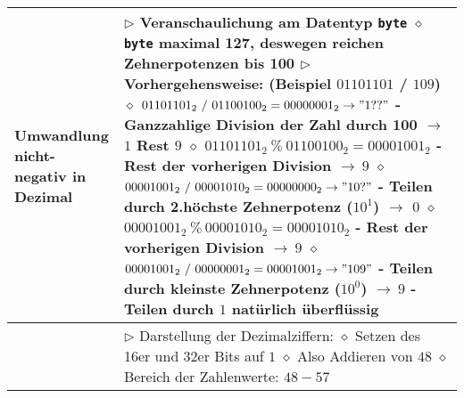 \begin{longtable}{ | p{} p{} | }
	\makecell[l]{Umwandlung nicht- \\ negativ in Dezimal} & \makecell[l]{
	$\triangleright$ Veranschaulichung am Datentyp \texttt{byte} \\
	\hspace{0.4cm} $\diamond$ \texttt{byte} maximal 127, deswegen reichen Zehnerpotenzen bis 100 \\
	$\triangleright$ Vorhergehensweise: (Beispiel $01101101$ / $109$) \\
	\hspace{0.4cm} $\diamond$ $01101101_2~/~01100100_2=00000001_2 \rightarrow "1??"$ \\
	\hspace{0.6cm} - Ganzzahlige Division der Zahl durch 100 $\rightarrow$ $1$ Rest $9$ \\
	\hspace{0.4cm} $\diamond$ $01101101_2~\%~01100100_2=00001001_2$ \\
	\hspace{0.6cm} - Rest der vorherigen Division $\rightarrow~9$ \\
	\hspace{0.4cm} $\diamond$ $00001001_2~/~00001010_2=00000000_2 \rightarrow "10?"$ \\
	\hspace{0.6cm} - Teilen durch 2.höchste Zehnerpotenz ($10^1$) $\rightarrow$ $0$ \\
	\hspace{0.4cm} $\diamond$ $00001001_2~\%~00001010_2=00001010_2$ \\
	\hspace{0.6cm} - Rest der vorherigen Division $\rightarrow~9$ \\
	\hspace{0.4cm} $\diamond$ $00001001_2~/~00000001_2=00001001_2 \rightarrow "109"$ \\
	\hspace{0.6cm} - Teilen durch kleinste Zehnerpotenz ($10^0$) $\rightarrow~9$ \\
	\hspace{0.6cm} - Teilen durch $1$ natürlich überflüssig} \\ \hline

	\makecell[l]{Unicode-Kodierung} & \makecell[l]{
	$\triangleright$ Darstellung der Dezimalziffern: \\
	\hspace{0.4cm} $\diamond$ Setzen des 16er und 32er Bits auf $1$ \\
	\hspace{0.4cm} $\diamond$ Also Addieren von $48$ \\
	\hspace{0.4cm} $\diamond$ Bereich der Zahlenwerte: $48-57$} \\ \hline


\end{longtable}
